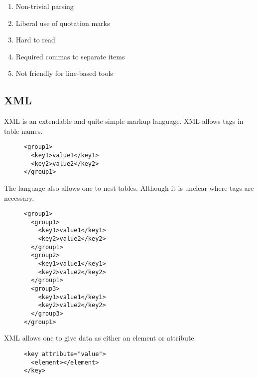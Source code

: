 \documentclass[listof=totoc]{article}
\begin{document}
\begin{enumerate}
  \item Non-trivial parsing
  \item Liberal use of quotation marks
  \item Hard to read
  \item Required commas to separate items
  \item Not friendly for line-based tools
\end{enumerate}

\subsection{XML}
\noindent XML is an extendable and quite simple markup language. XML allows tags in table names.


\begin{figure}[H]
\centering
\begin{varwidth}{\linewidth}
\begin{verbatim}
<group1>
  <key1>value1</key1>
  <key2>value2</key2>
</group1>
\end{verbatim}
\end{varwidth}
\caption{}
\end{figure}

\noindent The language also allows one to nest tables. Although it is unclear where tags are necessary.


\begin{figure}[H]
\centering
\begin{varwidth}{\linewidth}
\begin{verbatim}
<group1>
  <group1>
    <key1>value1</key1>
    <key2>value2</key2>
  </group1>
  <group2>
    <key1>value1</key1>
    <key2>value2</key2>
  </group1>
  <group3>
    <key1>value1</key1>
    <key2>value2</key2>
  </group3>
</group1>
\end{verbatim}
\end{varwidth}
\caption{}
\end{figure}

\noindent XML allows one to give data as either an element or attribute.


\begin{figure}[H]
\centering
\begin{varwidth}{\linewidth}
\begin{verbatim}
<key attribute="value">
  <element></element>
</key>
\end{verbatim}
\end{varwidth}
\caption{}
\end{figure}
\end{document}
